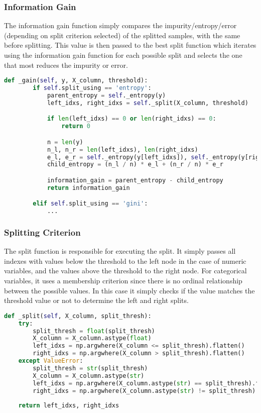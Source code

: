 \documentclass{article}
\begin{document}
\subsubsection{Information Gain}
The information gain function simply compares the impurity/entropy/error (depending on split criterion selected) of the splitted samples, with the same before splitting. This value is then passed to the best split function which iterates using the information gain function for each possible split and selects the one that most reduces the impurity or error.

\begin{lstlisting}[language=Python, caption=Splitting and Information Gain Calculation]
    def _gain(self, y, X_column, threshold):
        if self.split_using == 'entropy':
            parent_entropy = self._entropy(y)
            left_idxs, right_idxs = self._split(X_column, threshold)

            if len(left_idxs) == 0 or len(right_idxs) == 0:
                return 0

            n = len(y)
            n_l, n_r = len(left_idxs), len(right_idxs)
            e_l, e_r = self._entropy(y[left_idxs]), self._entropy(y[right_idxs])
            child_entropy = (n_l / n) * e_l + (n_r / n) * e_r

            information_gain = parent_entropy - child_entropy
            return information_gain

        elif self.split_using == 'gini':
            ...

\end{lstlisting}

\subsubsection{Splitting Criterion}
The split function is responsible for executing the split. It simply passes all indexes with values below the threshold to the left node in the case of numeric variables, and the values above the threshold to the right node. For categorical variables, it uses a membership criterion since there is no ordinal relationship between the possible values. In this case it simply checks if the value matches the threshold value or not to determine the left and right splits.

\begin{lstlisting}[language=Python, caption=Splitting for categorical and numeric variables]
def _split(self, X_column, split_thresh):
    try:
        split_thresh = float(split_thresh)
        X_column = X_column.astype(float)
        left_idxs = np.argwhere(X_column <= split_thresh).flatten()
        right_idxs = np.argwhere(X_column > split_thresh).flatten() 
    except ValueError:
        split_thresh = str(split_thresh)
        X_column = X_column.astype(str)
        left_idxs = np.argwhere(X_column.astype(str) == split_thresh).flatten()
        right_idxs = np.argwhere(X_column.astype(str) != split_thresh).flatten()
    
    return left_idxs, right_idxs
\end{lstlisting}
\end{document}
